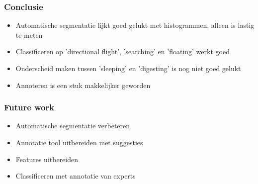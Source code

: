 \documentclass{beamer}
\newcommand{\slide}[2]
{
\begin{frame}
\frametitle{#1} 

#2

\end{frame}
}
\begin{document}
\slide{Conclusie}
{
\begin{itemize}
	\item Automatische segmentatie lijkt goed gelukt met histogrammen, alleen is lastig te meten
	\item Classificeren op 'directional flight', 'searching' en 'floating' werkt goed
	\item Onderscheid maken tussen 'sleeping' en 'digesting' is nog niet goed gelukt
	\item Annoteren is een stuk makkelijker geworden
\end{itemize} 
}

\slide{Future work}
{
\begin{itemize}
	\item Automatische segmentatie verbeteren
	\item Annotatie tool uitbereiden met suggesties
	\item Features uitbereiden
	\item Classificeren met annotatie van experts
\end{itemize} 
}
\end{document}
